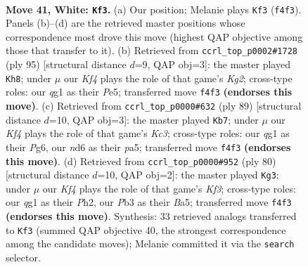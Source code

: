\documentclass[11pt]{article}
\begin{document}
\clearpage

\begin{figure}[p]\centering
\begin{subfigure}{0.46\textwidth}\centering
\resizebox{\linewidth}{!}{%
\newchessgame
\chessboard[
  setfen={3k4/8/3n1b2/8/1p3K2/1P6/8/6q1 w - - 2 41},
  showmover=false,
  pgfstyle=straightmove, color=movearrow, markmove={f4-f3}
]}
\caption{}
\end{subfigure}\hfill
\begin{subfigure}{0.46\textwidth}\centering
\resizebox{\linewidth}{!}{%
\newchessgame
\chessboard[
  setfen={8/6k1/8/3Bp1p1/8/5K1P/8/8 b - - 4 48},
  showmover=false,
  pgfstyle=straightmove, color=movearrow, markmove={g7-h8}
]}
\caption{}
\end{subfigure}
\\[4pt]
\begin{subfigure}{0.46\textwidth}\centering
\resizebox{\linewidth}{!}{%
\newchessgame
\chessboard[
  setfen={8/p7/2k3p1/P7/8/7N/5K2/8 b - - 0 45},
  showmover=false,
  pgfstyle=straightmove, color=movearrow, markmove={c6-b7}
]}
\caption{}
\end{subfigure}\hfill
\begin{subfigure}{0.46\textwidth}\centering
\resizebox{\linewidth}{!}{%
\newchessgame
\chessboard[
  setfen={8/8/3n4/B4k1p/8/5K2/7P/8 w - - 1 41},
  showmover=false,
  pgfstyle=straightmove, color=movearrow, markmove={f3-g3}
]}
\caption{}
\end{subfigure}
\caption{\textbf{Move 41, White: \texttt{Kf3}.} (a) Our position; Melanie plays \texttt{Kf3} (\texttt{f4f3}). Panels (b)--(d) are the retrieved master positions whose correspondence most drove this move (highest QAP objective among those that transfer to it). (b) Retrieved from \texttt{ccrl\_top\_p0002\#1728} (ply 95) [structural distance $d$=9, QAP obj=3]: the master played \texttt{Kh8}; under $\mu$ our \emph{Kf4} plays the role of that game's \emph{Kg2}; cross-type roles: our \emph{q}g1 as their \emph{P}e5; transferred move \texttt{f4f3} \textbf{(endorses this move)}. (c) Retrieved from \texttt{ccrl\_top\_p0000\#632} (ply 89) [structural distance $d$=10, QAP obj=3]: the master played \texttt{Kb7}; under $\mu$ our \emph{Kf4} plays the role of that game's \emph{Kc3}; cross-type roles: our \emph{q}g1 as their \emph{P}g6, our \emph{n}d6 as their \emph{p}a5; transferred move \texttt{f4f3} \textbf{(endorses this move)}. (d) Retrieved from \texttt{ccrl\_top\_p0000\#952} (ply 80) [structural distance $d$=10, QAP obj=2]: the master played \texttt{Kg3}; under $\mu$ our \emph{Kf4} plays the role of that game's \emph{Kf3}; cross-type roles: our \emph{q}g1 as their \emph{P}h2, our \emph{P}b3 as their \emph{B}a5; transferred move \texttt{f4f3} \textbf{(endorses this move)}. Synthesis: 33 retrieved analogs transferred to \texttt{Kf3} (summed QAP objective 40, the strongest correspondence among the candidate moves); Melanie committed it via the \texttt{search} selector.}
\label{fig:thought-m80}
\end{figure}
\end{document}
